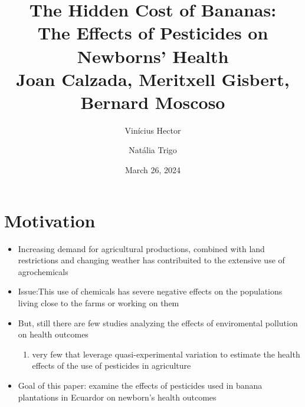 \documentclass[hyperref={pdfpagelabels=false}]{beamer}
\title[The Hidden Cost of Bananas] { The Hidden Cost of Bananas:  \\ The Effects of Pesticides on Newborns’ Health  \\  \vspace{5mm} \large \textcolor{myblue}{Joan Calzada, Meritxell Gisbert, Bernard Moscoso} }
\author[Vinícius Hector and Natália Trigo]{ \normalsize Vinícius Hector \and Natália Trigo}
\date{March 26, 2024}
\institute[]{ \textcolor{myblue}{ \href{https://www.journals.uchicago.edu/doi/abs/10.1086/725349?journalCode=jaere}{JAERE (2023) }}\\ \vspace{2mm} Environmental and Urban Economics \\ Professor: Sophie Mattes}
\begin{document}
	
	\begin{frame}
		\titlepage
	\end{frame} 
	
	
	\begin{frame}
		\frametitle{}
		\tableofcontents
	\end{frame} 
	
	
	\section{Motivation} 
	\begin{frame}
        \begin{itemize}
        \justifying
            \item Increasing demand for agricultural  productions, combined with land restrictions and changing weather has contribuited to the extensive use of agrochemicals
            \vspace{2mm}
            \item \textcolor{bondiblue}{Issue}:This use of chemicals has severe negative effects on the populations living close to the farms or working on them
            \vspace{2mm}
            \item But, still there are few studies analyzing the effects of enviromental pollution on health outcomes
            \vspace{2mm}
            \begin{enumerate}
                \item very few that leverage quasi-experimental variation to estimate the health effects of the use of pesticides in agriculture
            \end{enumerate}
            \vspace{2mm}
            \item \textcolor{bondiblue}{Goal of this paper}: examine the effects of pesticides used in banana plantations in Ecuardor on newborn's health outcomes
        \end{itemize}
 

        \end{frame}
\end{document}
